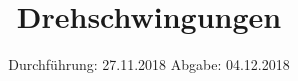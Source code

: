 

\subject{V102}
\title{Drehschwingungen}
\date{%
  Durchführung: 27.11.2018
  \hspace{3em}
  Abgabe: 04.12.2018
}



\maketitle
\thispagestyle{empty}
\tableofcontents
\newpage







\printbibliography{}


